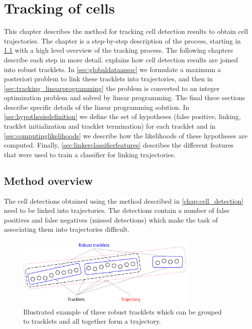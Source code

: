 \chapter{Tracking of cells}
	\label{chap:tracking}
	
	This chapter describes the method for tracking cell detection results to obtain cell trajectories. The chapter is a step-by-step description of the process, starting in \cref{sec:tracking_overview} with a high level overview of the tracking process. The following chapters describe each step in more detail.  explains how cell detection results are joined into robust tracklets. In \cref{sec:globaldataassoc} we formulate a maximum a posteriori problem to link these tracklets into trajectories, and then in \cref{sec:tracking_linearprogramming} the problem is converted to an integer optimization problem and solved by linear programming. The final three sections describe specific details of the linear programming solution. In \cref{sec:hypothesisdefinition} we define the set of hypotheses (false positive, linking, tracklet initialization and tracklet termination) for each tracklet and in \cref{sec:computinglikelihoods} we describe how the likelihoods of these hypotheses are computed. Finally, \cref{sec:linkerclassifierfeatures} describes the different features that were used to train a classifier for linking trajectories.
	
	\section{Method overview}
		\label{sec:tracking_overview}
		
		The cell detections obtained using the method described in \cref{chap:cell_detection} need to be linked into trajectories. The detections contain a number of false positives and false negatives (missed detections) which make the task of associating them into trajectories difficult.
		
		\begin{figure}[h]
			\centering
			\includegraphics[width=0.8\textwidth]{images/fig_tracklet_terminology}
			\caption{Illustrated example of three robust tracklets which can be grouped to tracklets and all together form a trajectory.}
			\label{fig:tracking_overview_terminology}
		\end{figure}
		

